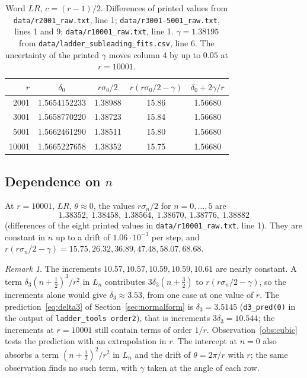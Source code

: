 \documentclass[11pt]{amsart}
\theoremstyle{definition}
\theoremstyle{remark}
\newtheorem{remark}[conjecture]{Remark}
\begin{document}
\begin{table}[ht]
\centering
\begin{tabular}{rcccc}
\toprule
$r$ & $\delta_0$ & $r\sigma_0/2$ & $r(r\sigma_0/2 - \gamma)$ & $\delta_0 + 2\gamma/r$ \\
\midrule
2001  & 1.5654152233 & 1.38988 & 15.86 & 1.56680 \\
3001  & 1.5658770220 & 1.38723 & 15.84 & 1.56680 \\
5001  & 1.5662461290 & 1.38511 & 15.80 & 1.56680 \\
10001 & 1.5665227658 & 1.38352 & 15.75 & 1.56680 \\
\bottomrule
\end{tabular}
\caption{Word $LR$, $c = (r-1)/2$. Differences of printed values from
\texttt{data/r2001\_raw.txt}, line 1; \texttt{data/r3001-5001\_raw.txt}, lines 1
and 9; \texttt{data/r10001\_raw.txt}, line 1. $\gamma = 1.38195$ from
\texttt{data/ladder\_subleading\_fits.csv}, line 6. The uncertainty of the printed
$\gamma$ moves column 4 by up to $0.05$ at $r = 10001$.}
\label{tab:rdep}
\end{table}

\subsection{Dependence on $n$}
At $r = 10001$, $LR$, $\theta \approx 0$, the values $r\sigma_n/2$ for
$n = 0, \dots, 5$ are
\[
1.38352,\ 1.38458,\ 1.38564,\ 1.38670,\ 1.38776,\ 1.38882
\]
(differences of the eight printed values in \texttt{data/r10001\_raw.txt}, line 1).
They are constant in $n$ up to a drift of $1.06\cdot10^{-3}$ per step, and
$r(r\sigma_n/2 - \gamma) = 15.75, 26.32, 36.89, 47.48, 58.07, 68.68$.

\begin{remark}\label{rem:cubic}
The increments $10.57, 10.57, 10.59, 10.59, 10.61$ are nearly constant. A term
$\delta_3(n+\frac12)^3/r^2$ in $L_n$ contributes $3\delta_3(n+\frac32)$ to
$r(r\sigma_n/2-\gamma)$, so the increments alone would give $\delta_3 \approx 3.53$,
from one case at one value of $r$. The prediction~\eqref{eq:delta3} of
Section~\ref{sec:normalform} is $\delta_3 = 3.5145$ (\texttt{d3\_pred(0)} in the output
of \texttt{ladder\_tools order2}), that is increments $3\delta_3 = 10.544$; the
increments at $r = 10001$ still contain terms of order $1/r$.
Observation~\ref{obs:cubic} tests the prediction with an extrapolation in $r$. The
intercept at $n = 0$ also absorbs a term $(n+\frac12)^2/r^2$ in $L_n$ and the drift of
$\theta = 2\pi/r$ with $r$; the same observation finds no such term, with $\gamma$
taken at the angle of each row.
\end{remark}
\end{document}

